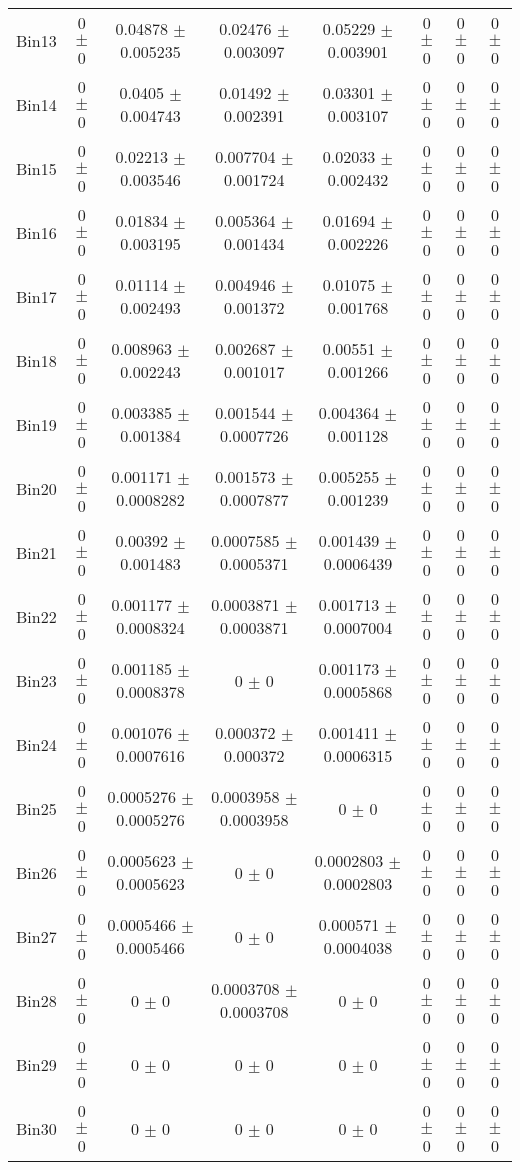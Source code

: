 \begin{tabular}{@{\extracolsep{4pt}}lccccccc@{}}
     Bin13 & 0 $\pm$ 0 & 0.04878 $\pm$ 0.005235 & 0.02476 $\pm$ 0.003097 & 0.05229 $\pm$ 0.003901 & 0 $\pm$ 0 & 0 $\pm$ 0 & 0 $\pm$ 0 \\ 
     Bin14 & 0 $\pm$ 0 & 0.0405 $\pm$ 0.004743 & 0.01492 $\pm$ 0.002391 & 0.03301 $\pm$ 0.003107 & 0 $\pm$ 0 & 0 $\pm$ 0 & 0 $\pm$ 0 \\ 
     Bin15 & 0 $\pm$ 0 & 0.02213 $\pm$ 0.003546 & 0.007704 $\pm$ 0.001724 & 0.02033 $\pm$ 0.002432 & 0 $\pm$ 0 & 0 $\pm$ 0 & 0 $\pm$ 0 \\ 
     Bin16 & 0 $\pm$ 0 & 0.01834 $\pm$ 0.003195 & 0.005364 $\pm$ 0.001434 & 0.01694 $\pm$ 0.002226 & 0 $\pm$ 0 & 0 $\pm$ 0 & 0 $\pm$ 0 \\ 
     Bin17 & 0 $\pm$ 0 & 0.01114 $\pm$ 0.002493 & 0.004946 $\pm$ 0.001372 & 0.01075 $\pm$ 0.001768 & 0 $\pm$ 0 & 0 $\pm$ 0 & 0 $\pm$ 0 \\ 
     Bin18 & 0 $\pm$ 0 & 0.008963 $\pm$ 0.002243 & 0.002687 $\pm$ 0.001017 & 0.00551 $\pm$ 0.001266 & 0 $\pm$ 0 & 0 $\pm$ 0 & 0 $\pm$ 0 \\ 
     Bin19 & 0 $\pm$ 0 & 0.003385 $\pm$ 0.001384 & 0.001544 $\pm$ 0.0007726 & 0.004364 $\pm$ 0.001128 & 0 $\pm$ 0 & 0 $\pm$ 0 & 0 $\pm$ 0 \\ 
     Bin20 & 0 $\pm$ 0 & 0.001171 $\pm$ 0.0008282 & 0.001573 $\pm$ 0.0007877 & 0.005255 $\pm$ 0.001239 & 0 $\pm$ 0 & 0 $\pm$ 0 & 0 $\pm$ 0 \\ 
     Bin21 & 0 $\pm$ 0 & 0.00392 $\pm$ 0.001483 & 0.0007585 $\pm$ 0.0005371 & 0.001439 $\pm$ 0.0006439 & 0 $\pm$ 0 & 0 $\pm$ 0 & 0 $\pm$ 0 \\ 
     Bin22 & 0 $\pm$ 0 & 0.001177 $\pm$ 0.0008324 & 0.0003871 $\pm$ 0.0003871 & 0.001713 $\pm$ 0.0007004 & 0 $\pm$ 0 & 0 $\pm$ 0 & 0 $\pm$ 0 \\ 
     Bin23 & 0 $\pm$ 0 & 0.001185 $\pm$ 0.0008378 & 0 $\pm$ 0 & 0.001173 $\pm$ 0.0005868 & 0 $\pm$ 0 & 0 $\pm$ 0 & 0 $\pm$ 0 \\ 
     Bin24 & 0 $\pm$ 0 & 0.001076 $\pm$ 0.0007616 & 0.000372 $\pm$ 0.000372 & 0.001411 $\pm$ 0.0006315 & 0 $\pm$ 0 & 0 $\pm$ 0 & 0 $\pm$ 0 \\ 
     Bin25 & 0 $\pm$ 0 & 0.0005276 $\pm$ 0.0005276 & 0.0003958 $\pm$ 0.0003958 & 0 $\pm$ 0 & 0 $\pm$ 0 & 0 $\pm$ 0 & 0 $\pm$ 0 \\ 
     Bin26 & 0 $\pm$ 0 & 0.0005623 $\pm$ 0.0005623 & 0 $\pm$ 0 & 0.0002803 $\pm$ 0.0002803 & 0 $\pm$ 0 & 0 $\pm$ 0 & 0 $\pm$ 0 \\ 
     Bin27 & 0 $\pm$ 0 & 0.0005466 $\pm$ 0.0005466 & 0 $\pm$ 0 & 0.000571 $\pm$ 0.0004038 & 0 $\pm$ 0 & 0 $\pm$ 0 & 0 $\pm$ 0 \\ 
     Bin28 & 0 $\pm$ 0 & 0 $\pm$ 0 & 0.0003708 $\pm$ 0.0003708 & 0 $\pm$ 0 & 0 $\pm$ 0 & 0 $\pm$ 0 & 0 $\pm$ 0 \\ 
     Bin29 & 0 $\pm$ 0 & 0 $\pm$ 0 & 0 $\pm$ 0 & 0 $\pm$ 0 & 0 $\pm$ 0 & 0 $\pm$ 0 & 0 $\pm$ 0 \\ 
     Bin30 & 0 $\pm$ 0 & 0 $\pm$ 0 & 0 $\pm$ 0 & 0 $\pm$ 0 & 0 $\pm$ 0 & 0 $\pm$ 0 & 0 $\pm$ 0 \\ 
\hline\hline
  \end{tabular}
